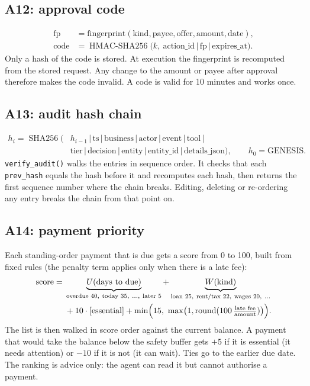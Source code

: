 \documentclass[10pt,a4paper]{article}
\newcommand{\code}[1]{\texttt{\small #1}}
\begin{document}
\subsection{A12: approval code}
\begin{align*}
\text{fp}&=\text{fingerprint}(\text{kind},\text{payee},\text{offer},\text{amount},\text{date}),\\
\text{code}&=\operatorname{HMAC\text{-}SHA256}\bigl(k,\ \text{action\_id}\,|\,\text{fp}\,|\,\text{expires\_at}\bigr).
\end{align*}
Only a hash of the code is stored. At execution the fingerprint is recomputed from the stored request. Any change to the amount or payee after approval therefore makes the code invalid. A code is valid for 10 minutes and works once.

\subsection{A13: audit hash chain}
\begin{align*}
h_i=\operatorname{SHA256}\bigl(&h_{i-1}\,|\,\text{ts}\,|\,\text{business}\,|\,\text{actor}\,|\,\text{event}\,|\,\text{tool}\,|\\
&\text{tier}\,|\,\text{decision}\,|\,\text{entity}\,|\,\text{entity\_id}\,|\,\text{details\_json}\bigr),\qquad h_0=\text{GENESIS}.
\end{align*}
\code{verify\_audit()} walks the entries in sequence order. It checks that each \code{prev\_hash} equals the hash before it and recomputes each hash, then returns the first sequence number where the chain breaks. Editing, deleting or re-ordering any entry breaks the chain from that point on.

\subsection{A14: payment priority}
Each standing-order payment that is due gets a score from 0 to 100, built from fixed rules (the penalty term applies only when there is a late fee):
\begin{align*}
\text{score}={}&\underbrace{U(\text{days to due})}_{\text{overdue }40,\ \text{today }35,\ \dots,\ \text{later }5}+\underbrace{W(\text{kind})}_{\text{loan }25,\ \text{rent/tax }22,\ \text{wages }20,\ \dots}\\
&+10\cdot[\text{essential}]+\min\Bigl(15,\ \max\bigl(1,\operatorname{round}(100\,\tfrac{\text{late fee}}{\text{amount}})\bigr)\Bigr).
\end{align*}
The list is then walked in score order against the current balance. A payment that would take the balance below the safety buffer gets $+5$ if it is essential (it needs attention) or $-10$ if it is not (it can wait). Ties go to the earlier due date. The ranking is advice only: the agent can read it but cannot authorise a payment.
\end{document}
